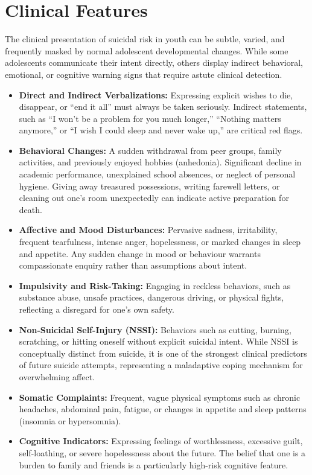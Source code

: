 \section*{Clinical Features}
The clinical presentation of suicidal risk in youth can be subtle, varied, and frequently masked by normal adolescent developmental changes. While some adolescents communicate their intent directly, others display indirect behavioral, emotional, or cognitive warning signs that require astute clinical detection.
\begin{itemize}
    \item \textbf{Direct and Indirect Verbalizations:} Expressing explicit wishes to die, disappear, or ``end it all'' must always be taken seriously. Indirect statements, such as ``I won't be a problem for you much longer,'' ``Nothing matters anymore,'' or ``I wish I could sleep and never wake up,'' are critical red flags.
    \item \textbf{Behavioral Changes:} A sudden withdrawal from peer groups, family activities, and previously enjoyed hobbies (anhedonia). Significant decline in academic performance, unexplained school absences, or neglect of personal hygiene. Giving away treasured possessions, writing farewell letters, or cleaning out one's room unexpectedly can indicate active preparation for death.
    \item \textbf{Affective and Mood Disturbances:} Pervasive sadness, irritability, frequent tearfulness, intense anger, hopelessness, or marked changes in sleep and appetite. Any sudden change in mood or behaviour warrants compassionate enquiry rather than assumptions about intent.
    \item \textbf{Impulsivity and Risk-Taking:} Engaging in reckless behaviors, such as substance abuse, unsafe practices, dangerous driving, or physical fights, reflecting a disregard for one's own safety.
    \item \textbf{Non-Suicidal Self-Injury (NSSI):} Behaviors such as cutting, burning, scratching, or hitting oneself without explicit suicidal intent. While NSSI is conceptually distinct from suicide, it is one of the strongest clinical predictors of future suicide attempts, representing a maladaptive coping mechanism for overwhelming affect.
    \item \textbf{Somatic Complaints:} Frequent, vague physical symptoms such as chronic headaches, abdominal pain, fatigue, or changes in appetite and sleep patterns (insomnia or hypersomnia).
    \item \textbf{Cognitive Indicators:} Expressing feelings of worthlessness, excessive guilt, self-loathing, or severe hopelessness about the future. The belief that one is a burden to family and friends is a particularly high-risk cognitive feature.
\end{itemize}

